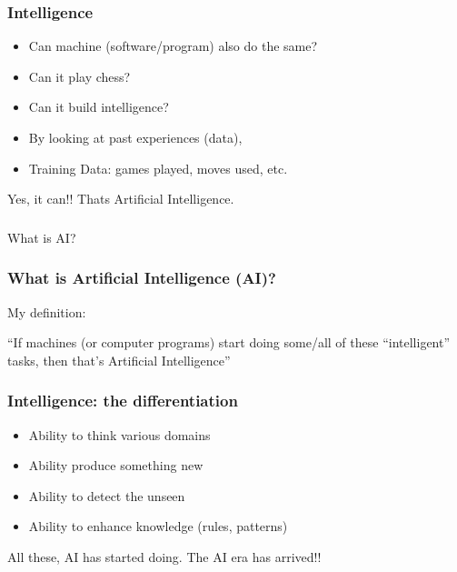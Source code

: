 \begin{frame}[fragile]\frametitle{Intelligence}
\begin{itemize}
\item Can machine (software/program) also do the same?
\item Can it play chess?
\item Can it build intelligence?
\item By looking at past experiences (data), 
\item Training Data: games played, moves used, etc.
\end{itemize}
Yes, it can!! Thats Artificial Intelligence.
\end{frame}

\begin{frame}[fragile]\frametitle{}
\begin{center}
{\Large What is AI?}
\end{center}
\end{frame}



\begin{frame}[fragile]\frametitle{ What is Artificial Intelligence (AI)?}
My definition:


``If machines (or computer programs) start doing some/all of these ``intelligent'' tasks, then that's Artificial Intelligence''

\end{frame}

\begin{frame}[fragile]\frametitle{ Intelligence: the differentiation}
\begin{itemize}
\item Ability to think various domains
\item Ability produce something new
\item Ability to detect the unseen
\item Ability to enhance knowledge (rules, patterns)
\end{itemize}
All these, AI has started doing. The AI era has arrived!!
\end{frame}

